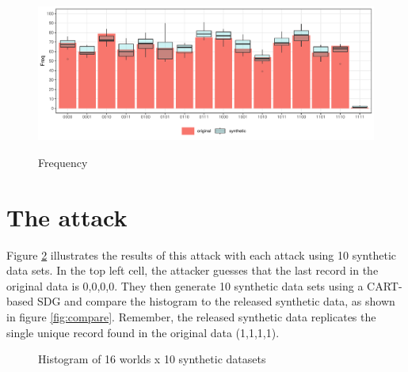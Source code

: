 \documentclass[runningheads]{llncs}
\begin{document}
\begin{figure}[!h]
    \centering
    \caption{Frequency}
    \includegraphics[width=\textwidth]{../graphs/graph_cart_histogram_compare_10.pdf}
    \label{fig:cart_histogram_compare_10}
\end{figure}

\section{The attack}



Figure \ref{fig:attacker_default} illustrates the results of this attack with each attack using 10 synthetic data sets.  In the top left cell, the attacker guesses that the last record in the original data is 0,0,0,0.  They then generate 10 synthetic data sets using a CART-based SDG and compare the histogram to the released synthetic data, as shown in figure \ref{fig:compare}.  Remember, the released synthetic data replicates the single unique record found in the original data (1,1,1,1).  

\begin{figure}[!h]
    \centering
    \caption{Histogram of 16 worlds x 10 synthetic datasets}
    \label{fig:attacker_default}
\end{figure}
\end{document}
